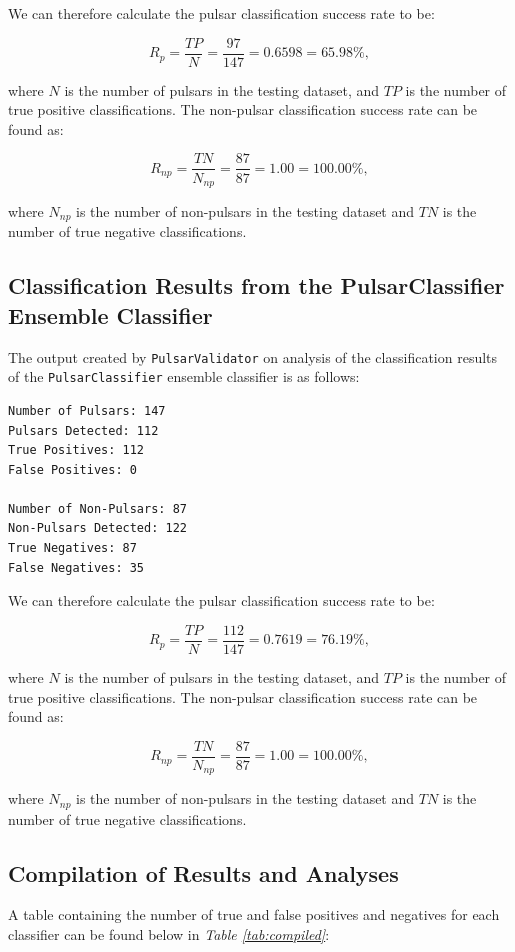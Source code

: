 \documentclass{article}
\begin{document}
We can therefore calculate the pulsar classification success rate to be:

$$ R_{p} = \frac{TP}{N} = \frac{97}{147} =  0.6598 = 65.98\%,$$

where $N$ is the number of pulsars in the testing dataset, and $TP$ is the number of true positive classifications. The non-pulsar classification success rate can be found as:

$$R_{np} = \frac{TN}{N_{np}} = \frac{87}{87} = 1.00 = 100.00\%,$$

where $N_{np}$ is the number of non-pulsars in the testing dataset and $TN$ is the number of true negative classifications.

\subsection{Classification Results from the PulsarClassifier Ensemble Classifier}

The output created by \verb|PulsarValidator| on analysis of the classification results of the \verb|PulsarClassifier| ensemble classifier is as follows:

\begin{lstlisting}[numbers=none]
Number of Pulsars: 147
Pulsars Detected: 112
True Positives: 112
False Positives: 0

Number of Non-Pulsars: 87
Non-Pulsars Detected: 122
True Negatives: 87
False Negatives: 35
\end{lstlisting}

We can therefore calculate the pulsar classification success rate to be:

$$ R_{p} = \frac{TP}{N} = \frac{112}{147} =  0.7619 = 76.19\%,$$

where $N$ is the number of pulsars in the testing dataset, and $TP$ is the number of true positive classifications. The non-pulsar classification success rate can be found as:

$$R_{np} = \frac{TN}{N_{np}} = \frac{87}{87} = 1.00 = 100.00\%,$$

where $N_{np}$ is the number of non-pulsars in the testing dataset and $TN$ is the number of true negative classifications.

\subsection{Compilation of Results and Analyses}

A table containing the number of true and false positives and negatives for each classifier can be found below in \emph{Table \ref{tab:compiled}}:
\end{document}
